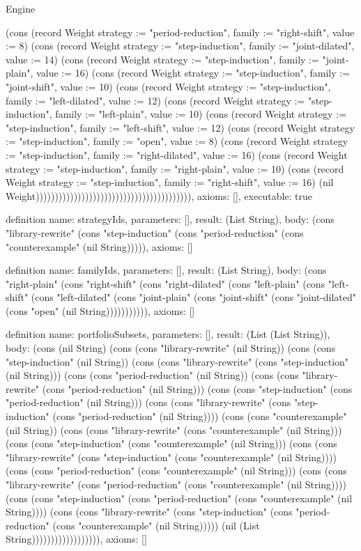 \begin{lexlean}{Engine}
\begin{semanticmodule}
{(cons (record Weight {strategy := "period-reduction", family := "right-shift", value := 8}) (cons (record Weight {strategy := "step-induction", family := "joint-dilated", value := 14}) (cons (record Weight {strategy := "step-induction", family := "joint-plain", value := 16}) (cons (record Weight {strategy := "step-induction", family := "joint-shift", value := 10}) (cons (record Weight {strategy := "step-induction", family := "left-dilated", value := 12}) (cons (record Weight {strategy := "step-induction", family := "left-plain", value := 10}) (cons (record Weight {strategy := "step-induction", family := "left-shift", value := 12}) (cons (record Weight {strategy := "step-induction", family := "open", value := 8}) (cons (record Weight {strategy := "step-induction", family := "right-dilated", value := 16}) (cons (record Weight {strategy := "step-induction", family := "right-plain", value := 10}) (cons (record Weight {strategy := "step-induction", family := "right-shift", value := 16}) (nil Weight))))))))))))))))))))))))))))))))))))))))),
  axioms: [],
  executable: true
}

definition{
  name: strategyIds,
  parameters: [],
  result: (List String),
  body: (cons "library-rewrite" (cons "step-induction" (cons "period-reduction" (cons "counterexample" (nil String))))),
  axioms: []
}

definition{
  name: familyIds,
  parameters: [],
  result: (List String),
  body: (cons "right-plain" (cons "right-shift" (cons "right-dilated" (cons "left-plain" (cons "left-shift" (cons "left-dilated" (cons "joint-plain" (cons "joint-shift" (cons "joint-dilated" (cons "open" (nil String))))))))))),
  axioms: []
}

definition{
  name: portfolioSubsets,
  parameters: [],
  result: (List (List String)),
  body: (cons (nil String) (cons (cons "library-rewrite" (nil String)) (cons (cons "step-induction" (nil String)) (cons (cons "library-rewrite" (cons "step-induction" (nil String))) (cons (cons "period-reduction" (nil String)) (cons (cons "library-rewrite" (cons "period-reduction" (nil String))) (cons (cons "step-induction" (cons "period-reduction" (nil String))) (cons (cons "library-rewrite" (cons "step-induction" (cons "period-reduction" (nil String)))) (cons (cons "counterexample" (nil String)) (cons (cons "library-rewrite" (cons "counterexample" (nil String))) (cons (cons "step-induction" (cons "counterexample" (nil String))) (cons (cons "library-rewrite" (cons "step-induction" (cons "counterexample" (nil String)))) (cons (cons "period-reduction" (cons "counterexample" (nil String))) (cons (cons "library-rewrite" (cons "period-reduction" (cons "counterexample" (nil String)))) (cons (cons "step-induction" (cons "period-reduction" (cons "counterexample" (nil String)))) (cons (cons "library-rewrite" (cons "step-induction" (cons "period-reduction" (cons "counterexample" (nil String))))) (nil (List String)))))))))))))))))),
  axioms: []
}


\end{semanticmodule}
\end{lexlean}
